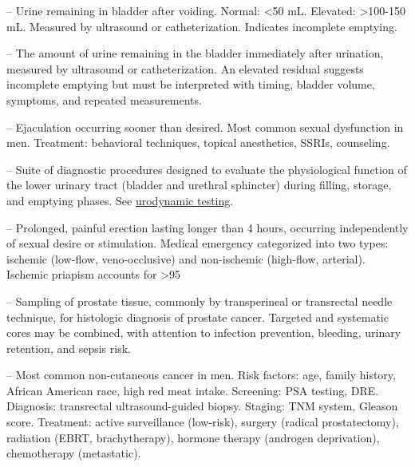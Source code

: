 -- Urine remaining in bladder after voiding. Normal: <50 mL. Elevated: >100-150 mL. Measured by ultrasound or catheterization. Indicates incomplete emptying.

-- The amount of urine remaining in the bladder immediately after urination, measured by ultrasound or catheterization. An elevated residual suggests incomplete emptying but must be interpreted with timing, bladder volume, symptoms, and repeated measurements.

-- Ejaculation occurring sooner than desired. Most common sexual dysfunction in men. Treatment: behavioral techniques, topical anesthetics, SSRIs, counseling.

-- Suite of diagnostic procedures designed to evaluate the physiological function of the lower urinary tract (bladder and urethral sphincter) during filling, storage, and emptying phases. See \hyperlink{Urodynamic Testing}{urodynamic testing}.

-- Prolonged, painful erection lasting longer than 4 hours, occurring independently of sexual desire or stimulation. Medical emergency categorized into two types: ischemic (low-flow, veno-occlusive) and non-ischemic (high-flow, arterial). Ischemic priapism accounts for >95%

-- Sampling of prostate tissue, commonly by transperineal or transrectal needle technique, for histologic diagnosis of prostate cancer. Targeted and systematic cores may be combined, with attention to infection prevention, bleeding, urinary retention, and sepsis risk.

-- Most common non-cutaneous cancer in men. Risk factors: age, family history, African American race, high red meat intake. Screening: PSA testing, DRE. Diagnosis: transrectal ultrasound-guided biopsy. Staging: TNM system, Gleason score. Treatment: active surveillance (low-risk), surgery (radical prostatectomy), radiation (EBRT, brachytherapy), hormone therapy (androgen deprivation), chemotherapy (metastatic).

